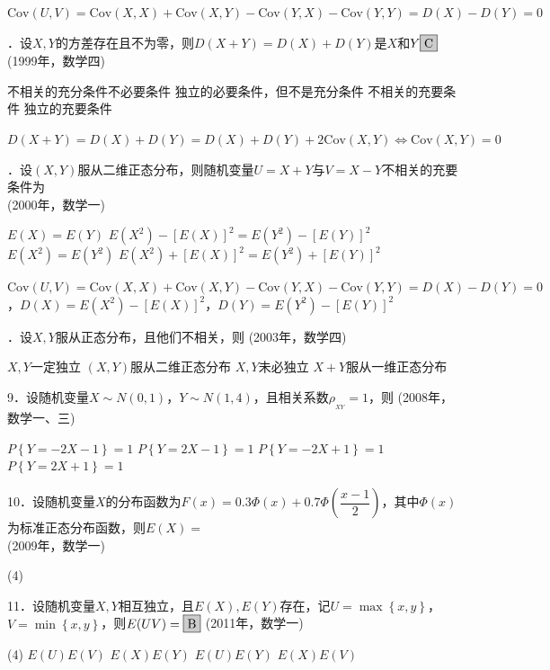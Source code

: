 \documentclass{ctexart}
\newcommand{\shortlabel}[1]
{
	\hfill
	{\small(#1)}\ignorespaces
}
\newcommand{\longlabel}[1]
{
	\\
	\hspace*{0mm}
	\hfill
	{\small(#1)}\ignorespaces
}
\newcommand{\highlightbox}[1]
{\fcolorbox{black}{gray!40}{$#1$}}
\newenvironment{answer}
{
	\begin{mdframed}[backgroundcolor=gray!40, hidealllines=true, skipabove=0pt, skipbelow=0pt]
	\noindent\ignorespaces
}
{  
	\end{mdframed}
}
\begin{document}
\begin{answer}
$\mathrm{Cov}(U,V)=\mathrm{Cov}(X,X)+\mathrm{Cov}(X,Y)-\mathrm{Cov}(Y,X)-\mathrm{Cov}(Y,Y)=D(X)-D(Y)=0$
\end{answer}
6．设$X,Y$的方差存在且不为零，则$D(X+Y)=D(X)+D(Y)$是$X$和$Y\highlightbox{\text{C}}$\shortlabel{1999年，数学四}
\begin{mytasks}
\task 不相关的充分条件不必要条件
\task 独立的必要条件，但不是充分条件
\task 不相关的充要条件
\task 独立的充要条件 
\end{mytasks}
\begin{answer}
$D(X+Y)=D(X)+D(Y)=D(X)+D(Y)+2\mathrm{Cov}(X,Y)\Longleftrightarrow\mathrm{Cov}(X,Y)=0$
\end{answer}
7．设$(X,Y)$服从二维正态分布，则随机变量$U=X+Y$与$V=X-Y$不相关的充要条件为\highlightbox{\text{B}}\longlabel{2000年，数学一}
\begin{mytasks}
\task $E(X)=E(Y)$
\task $E(X^2)-\left[E(X)\right]^2=E(Y^2)-\left[E(Y)\right]^2$
\task $E(X^2)=E(Y^2)$
\task $E(X^2)+\left[E(X)\right]^2=E(Y^2)+\left[E(Y)\right]^2$
\end{mytasks}
\begin{answer}
$\mathrm{Cov}(U,V)=\mathrm{Cov}(X,X)+\mathrm{Cov}(X,Y)-\mathrm{Cov}(Y,X)-\mathrm{Cov}(Y,Y)=D(X)-D(Y)=0$，$D(X)=E(X^2)-\left[E(X)\right]^2$，$D(Y)=E(Y^2)-\left[E(Y)\right]^2$
\end{answer}
8．设$X,Y$服从正态分布，且他们不相关，则\shortlabel{2003年，数学四}
\begin{mytasks}
\task $X,Y$一定独立
\task $(X,Y)$服从二维正态分布
\task $X,Y$未必独立
\task $X+Y$服从一维正态分布
\end{mytasks}
9．设随机变量$X\sim N(0,1)$，$Y\sim N(1,4)$，且相关系数$\rho_{_{XY}}=1$，则\shortlabel{2008年，数学一、三}
\begin{mytasks}
\task $P\left\{Y=-2X-1\right\}=1$
\task $P\left\{Y=2X-1\right\}=1$
\task $P\left\{Y=-2X+1\right\}=1$
\task $P\left\{Y=2X+1\right\}=1$
\end{mytasks}
10．设随机变量$X$的分布函数为$F(x)=0.3\varPhi(x)+0.7\varPhi\left(\dfrac{x-1}{2}\right)$，其中$\varPhi(x)$为标准正态分布函数，则$E(X)=$\longlabel{2009年，数学一}
\begin{mytasks}(4)
\end{mytasks}
11．设随机变量$X,Y$相互独立，且$E(X),E(Y)$存在，记$U=\max\left\{x,y\right\}$，$V=\min\left\{x,y\right\}$，则$E(UV)=\highlightbox{\text{B}}$\shortlabel{2011年，数学一}
\begin{mytasks}(4)
\task $E(U)E(V)$
\task $E(X)E(Y)$
\task $E(U)E(Y)$
\task $E(X)E(V)$
\end{mytasks}
\end{document}
